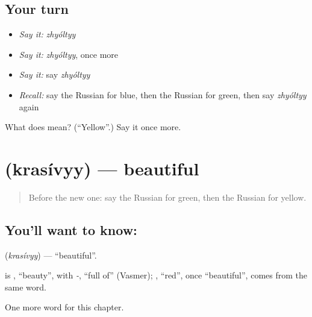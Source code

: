 \subsection*{Your turn}
\begin{itemize}
\raggedright
  \item \emph{Say it:} \emph{zhyóltyy}
  \item \emph{Say it:} \emph{zhyóltyy}, once more
  \item \emph{Say it:} say \emph{zhyóltyy}
  \item \emph{Recall:} say the Russian for blue, then the Russian for green, then say \emph{zhyóltyy} again
\end{itemize}

\begin{tcolorbox}[breakable,colback=teal!4,colframe=teal!35!black,title={Before you move on}]
What does  mean? (\textquotedblleft{}Yellow\textquotedblright{}.) Say it once more.
\end{tcolorbox}
\section[\texorpdfstring{\ru{красивый} (krasívyy)}{красивый (krasívyy)}]{ (krasívyy) — beautiful}

\label{lesson:RU-C64-beautiful}



\begin{quote}
Before the new one: say the Russian for green, then the Russian for yellow.
\end{quote}

\subsection*{You'll want to know: }
\textbf{} (\emph{krasívyy}) — \textquotedblleft{}beautiful\textquotedblright{}.

\begin{cousinweb}
\textbf{} is \emph{}, \textquotedblleft{}beauty\textquotedblright{}, with \emph{-}, \textquotedblleft{}full of\textquotedblright{} (Vasmer); \emph{}, \textquotedblleft{}red\textquotedblright{}, once \textquotedblleft{}beautiful\textquotedblright{}, comes from the same word.
\end{cousinweb}

\begin{grammarlens}[title={What you've built}]
One more word for this chapter.
\end{grammarlens}

